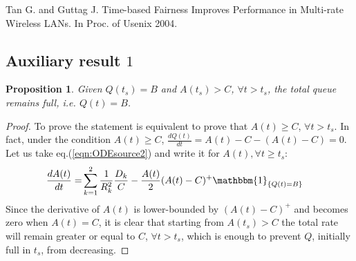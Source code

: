 \documentclass[a4paper,oneside, 11pt]{article}
\newcommand{\I}[1]{  \mathbbm{1}_{ \left\{  #1 \right\} }   }
\newtheorem{prop}[theorem]{Proposition}
\begin{document}
Tan G. and Guttag J.
Time-based Fairness Improves Performance in Multi-rate Wireless LANs.
In Proc. of Usenix 2004.
\begin{appendix}
\section{Auxiliary result $1$}\label{app:1}
\begin{prop}Given $Q(t_s)=B$ and $A(t_s)> C$, $\forall t>t_s$, the total queue remains full, i.e. $Q(t)=B$.
\end{prop}
\begin{proof}
To prove the statement is equivalent to prove that $A(t)\ge C$, $\forall t>t_s$.
In fact, under the condition $A(t)\ge C$, $\frac{dQ(t)}{dt}=A(t)-C-(A(t)-C)=0$.
Let us take eq.(\ref{eqn:ODEsource2}) and write it for $A(t), \forall t\ge t_s$:
\begin{align}\label{eqn:ODEsource3}
\frac{dA(t)}{dt}=&\sum_{k=1}^2 \frac{1}{R_k^2}\frac{D_k}{C}-\frac{A(t)}{2}(A(t)-C)^+ \I{Q(t)=B}
\end{align}
Since the derivative of $A(t)$ is lower-bounded by $(A(t)-C)^+$ and becomes zero when $A(t)=C$,  it is clear that starting from $A(t_s)>C$ the total rate will remain
greater or equal to $C$, $\forall t>t_s$, which is enough to prevent $Q$, initially full in $t_s$, from decreasing.
\end{proof}

\end{appendix}
\end{document}
